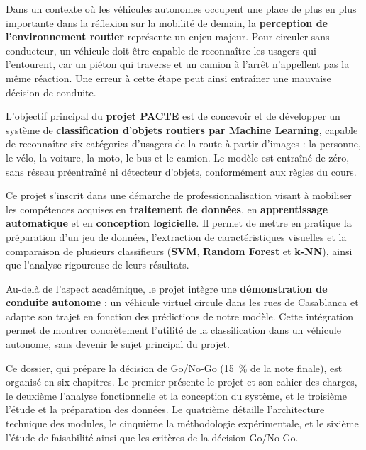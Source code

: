 \label{chap:introduction}

Dans un contexte où les véhicules autonomes occupent une place de plus en plus importante dans la réflexion sur la mobilité de demain, la \textbf{perception de l'environnement routier} représente un enjeu majeur. Pour circuler sans conducteur, un véhicule doit être capable de reconnaître les usagers qui l'entourent, car un piéton qui traverse et un camion à l'arrêt n'appellent pas la même réaction. Une erreur à cette étape peut ainsi entraîner une mauvaise décision de conduite.

L'objectif principal du \textbf{projet PACTE} est de concevoir et de développer un système de \textbf{classification d'objets routiers par Machine Learning}, capable de reconnaître six catégories d'usagers de la route à partir d'images : la personne, le vélo, la voiture, la moto, le bus et le camion. Le modèle est entraîné de zéro, sans réseau préentraîné ni détecteur d'objets, conformément aux règles du cours.

Ce projet s'inscrit dans une démarche de professionnalisation visant à mobiliser les compétences acquises en \textbf{traitement de données}, en \textbf{apprentissage automatique} et en \textbf{conception logicielle}. Il permet de mettre en pratique la préparation d'un jeu de données, l'extraction de caractéristiques visuelles et la comparaison de plusieurs classifieurs (\textbf{SVM}, \textbf{Random Forest} et \textbf{k-NN}), ainsi que l'analyse rigoureuse de leurs résultats.

Au-delà de l'aspect académique, le projet intègre une \textbf{démonstration de conduite autonome} : un véhicule virtuel circule dans les rues de Casablanca et adapte son trajet en fonction des prédictions de notre modèle. Cette intégration permet de montrer concrètement l'utilité de la classification dans un véhicule autonome, sans devenir le sujet principal du projet.

Ce dossier, qui prépare la décision de Go/No-Go (15~\% de la note finale), est organisé en six chapitres. Le premier présente le projet et son cahier des charges, le deuxième l'analyse fonctionnelle et la conception du système, et le troisième l'étude et la préparation des données. Le quatrième détaille l'architecture technique des modules, le cinquième la méthodologie expérimentale, et le sixième l'étude de faisabilité ainsi que les critères de la décision Go/No-Go.
